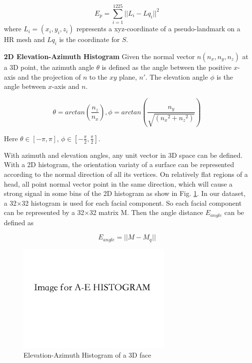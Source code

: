 \documentclass[annual]{acmsiggraph}
\begin{document}
\begin{equation}
E_p=\sum_{i=1}^{1225}{||L_i-Lq_i||^2}
\end{equation}
where $L_{i}=(x_i,y_i,z_i)$ represents a xyz-coordinate of a pseudo-landmark on a HR mesh and $Lq_{i}$ is the coordinate for $S$.

\textbf{2D Elevation-Azimuth Histogram} Given the normal vector $n(n_x,n_y,n_z)$ at a 3D point, the azimuth angle $\theta$ is defined as the angle between the positive $x$-axis and the projection of $n$ to the $xy$ plane, $n'$. The elevation angle $\phi$ is the angle between $x$-axis and $n$.

\begin{equation}
\theta=arctan(\frac{n_z}{n_x}) ,         \phi=arctan(\frac{n_y}{\sqrt{({n_x}^2+{n_z}^2)}})
\end{equation}

Here $\theta{\in}[-\pi,\pi]$, $\phi{\in}[-\frac{\pi}{2},\frac{\pi}{2}]$.

With azimuth and elevation angles, any unit vector in 3D space can be defined. With a 2D histogram, the orientation variaty of a surface can be represented according to the normal direction of all its vertices. On relatively flat regions of a head, all point normal vector point in the same direction, which will cause a strong signal in some bins of the 2D histogram as show in Fig. \ref{AEhist}. In our dataset, a 32$\times$32 histogram is used for each facial component. So each facial component can be represented by a 32$\times$32 matrix M. Then the angle distance $E_{angle}$ can be defined as 

\begin{equation}
E_{angle}=||M-M_q||
\end{equation}

\begin{figure}[ht]
  \centering
  \includegraphics[width=3in]{images/AEhist}
  \caption{Elevation-Azimuth Histogram of a 3D face}\label{AEhist}
\end{figure}
\end{document}

